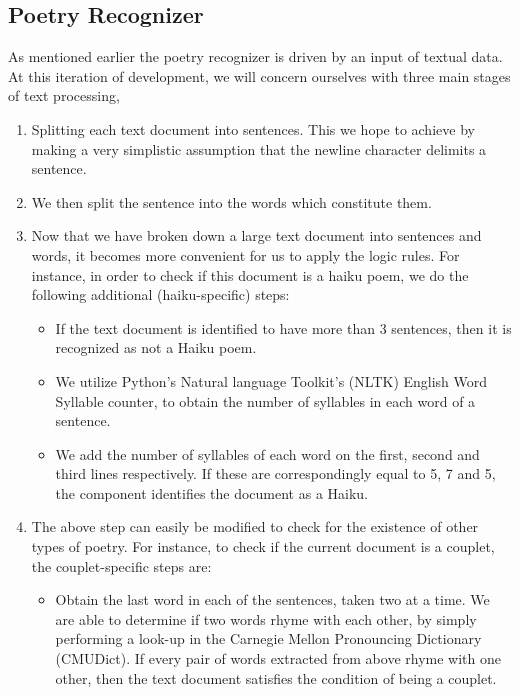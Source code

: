\documentclass[10pt, letter,twocolumn]{IEEEtran}
\begin{document}
\subsection{Poetry Recognizer}
As mentioned earlier the poetry recognizer is driven by an input of textual data. At this iteration of development, we will concern ourselves with three main stages of text processing,
\begin{enumerate}
	\item Splitting each text document into sentences. This we hope to achieve by making a very simplistic assumption that the newline character delimits a sentence.
	\item We then split the sentence into the words which constitute them.
	\item Now that we have broken down a large text document into sentences and words, it becomes more convenient for us to apply the logic rules. For instance, in order to check if this document is a haiku poem, we do the following additional (haiku-specific) steps:
		\begin{itemize}
			\item If the text document is identified to have more than 3 sentences, then it is recognized as not a Haiku poem.
			\item We utilize Python's Natural language Toolkit's (NLTK) English Word Syllable counter, to obtain the number of syllables in each word of a sentence.
			\item We add the number of syllables of each word on the first, second and third lines respectively. If these are correspondingly equal to 5, 7 and 5, the component identifies the document as a Haiku.
		\end{itemize}
	\item The above step can easily be modified to check for the existence of other types of poetry. For instance, to check if the current document is a couplet, the couplet-specific steps are:
		\begin{itemize}
			\item Obtain the last word in each of the sentences, taken two at a time. We are able to determine if two words rhyme with each other, by simply performing a look-up in the Carnegie Mellon Pronouncing Dictionary (CMUDict). If every pair of words extracted from above rhyme with one other, then the text document satisfies the condition of being a couplet.
		\end{itemize}
\end{enumerate}
\end{document}
